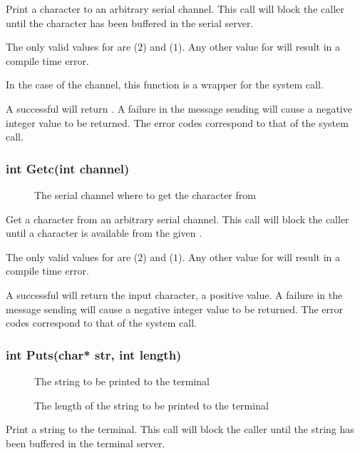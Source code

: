 \documentclass[pdftex,10pt,a4paper]{article}
\begin{document}
Print a character to an arbitrary serial channel. This call will block
the caller until the character has been buffered in the serial server.

The only valid values for  are  ($2$) and
 ($1$). Any other value for  will result in a
compile time error.

In the case of the  channel, this function is a wrapper
for the  system call.

A successful  will return . A failure in the message
sending will cause a negative integer value to be returned. The error
codes correspond to that of the  system call.


\subsubsection*{int Getc(int channel)}

\begin{description}
\item[] The serial channel where to get the character from
\end{description}

Get a character from an arbitrary serial channel. This call will block
the caller until a character is available from the given .

The only valid values for  are  ($2$) and
 ($1$). Any other value for  will result in a
compile time error.

A successful  will return the input character, a positive
value. A failure in the message sending will cause a negative integer
value to be returned. The error codes correspond to that of the
 system call.


\subsubsection*{int Puts(char* str, int length)}

\begin{description}
\item[] The string to be printed to the terminal
\item[] The length of the string to be printed to the terminal
\end{description}

Print a string to the terminal. This call will block the caller until
the string has been buffered in the terminal server.
\end{document}
